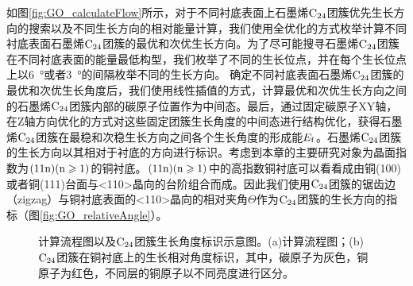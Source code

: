     如图\ref{fig:GO_calculateFlow}所示，对于不同衬底表面上石墨烯$\rm{C_{24}}$团簇优先生长方向的搜索以及不同生长方向的相对能量计算，我们使用全优化的方式枚举计算不同衬底表面石墨烯$\rm{C_{24}}$团簇的最优和次优生长方向。为了尽可能搜寻石墨烯$\rm{C_{24}}$团簇在不同衬底表面的能量最低构型，我们枚举了不同的生长位点，并在每个生长位点上以\SI{6}{\degree}或者\SI{3}{\degree}的间隔枚举不同的生长方向。 确定不同衬底表面石墨烯$\rm{C_{24}}$团簇的最优和次优生长角度后，我们使用线性插值的方式，计算最优和次优生长方向之间的石墨烯$\rm{C_{24}}$团簇内部的碳原子位置作为中间态。最后，通过固定碳原子XY轴，在Z轴方向优化的方式对这些固定团簇生长角度的中间态进行结构优化，获得石墨烯$\rm{C_{24}}$团簇在最稳和次稳生长方向之间各个生长角度的形成能$E_{\rm{f}}$。石墨烯$\rm{C_{24}}$团簇的生长方向以其相对于衬底的方向进行标识。考虑到本章的主要研究对象为晶面指数为$\rm{(11n)(n \geqslant 1)}$的铜衬底。$\rm{(11n)(n \geqslant 1)}$中的高指数铜衬底可以看看成由铜(100)或者铜(111)台面与<110>晶向的台阶组合而成。因此我们使用$\rm{C_{24}}$团簇的锯齿边（zigzag）与铜衬底表面的<110>晶向的相对夹角$\Theta$作为$\rm{C_{24}}$团簇的生长方向的指标（图\ref{fig:GO_relativeAngle}）。
    \begin{figure}[htb]
        \caption{计算流程图以及$\rm{C_{24}}$团簇生长角度标识示意图。(a)计算流程图；(b)$\rm{C_{24}}$团簇在铜衬底上的生长相对角度标识，其中，碳原子为灰色，铜原子为红色，不同层的铜原子以不同亮度进行区分。}
        \label{fig:GO_calculateFlow_relativeAngle}
    \end{figure}

